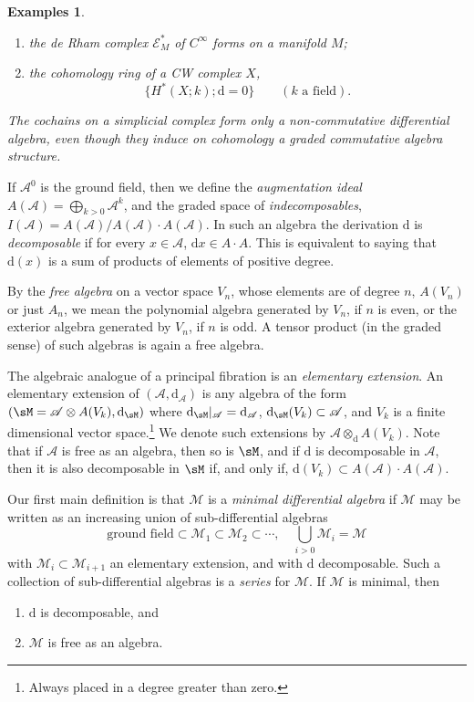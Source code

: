 \documentclass[11pt]{amsart}
\theoremstyle{plain}
\newtheorem{examples}[theorem]{Examples}
\theoremstyle{definition}
\newcommand{\sA}{\mathscr{A}}
\newcommand{\sE}{\mathscr{E}}
\newcommand{\cM}{\mathcal{M}}
\newcommand{\dd}{\mathrm{d}}
\begin{document}
\begin{examples}%
\begin{enumerate}
\item[(i)] the de Rham complex $\sE^{*}_{M}$ of $C^{\infty}$ forms on a manifold $M$;
\item[(ii)] the cohomology ring of a CW complex $X$,
\[
\{H^{*}(X; k); \dd = 0\} \qquad (k \text{ a field}).
\]
\end{enumerate}
The cochains on a simplicial complex form only a non-commutative differential algebra, even though they induce on cohomology a graded commutative algebra structure.
\end{examples}

If $\sA^{0}$ is the ground field, then we define the \emph{augmentation ideal} $A(\sA) = \bigoplus_{k > 0} \sA^{k}$, and the graded space of \emph{indecomposables}, $I(\sA) = A(\sA)/A(\sA) \cdot A(\sA)$. In such an algebra the derivation $\dd$ is \emph{decomposable} if for every $x \in \sA$, $\dd x \in A \cdot A$. This is equivalent to saying that $\dd(x)$ is a sum of products of elements of positive degree.

By the \emph{free algebra} on a vector space $V_{n}$, whose elements are of degree $n$, $A(V_{n})$ or just $A_{n}$, we mean the polynomial algebra generated by $V_{n}$, if $n$ is even, or the exterior algebra generated by $V_{n}$, if $n$ is odd. A tensor product (in the graded sense) of such algebras is again a free algebra.

The algebraic analogue of a principal fibration is an \emph{elementary extension}. An elementary extension of $(\sA, \dd_{\sA})$ is any algebra of the form $(\sM = \sA \otimes A(V_{k}), \dd_{\sM})$ where $\dd_{\sM}|_{\sA} = \dd_{\sA}$, $\dd_{\sM}(V_{k}) \subset \sA$, and $V_{k}$ is a finite dimensional vector space.\footnote{Always placed in a degree greater than zero.} We denote such extensions by $\sA \otimes_{\dd} A(V_{k})$. Note that if $\sA$ is free as an algebra, then so is $\sM$, and if $\dd$ is decomposable in $\sA$, then it is also decomposable in $\sM$ if, and only if, $\dd(V_{k}) \subset A(\sA) \cdot A(\sA)$.

Our first main definition is that $\cM$ is a \emph{minimal differential algebra} if $\cM$ may be written as an increasing union of sub-differential algebras
\[
\text{ground field} \subset \cM_{1} \subset \cM_{2} \subset \cdots, \quad \bigcup_{i > 0} \cM_{i} = \cM
\]
with $\cM_{i} \subset \cM_{i+1}$ an elementary extension, and with $\dd$ decomposable. Such a collection of sub-differential algebras is a \emph{series} for $\cM$. If $\cM$ is minimal, then
\begin{enumerate}
\item $\dd$ is decomposable, and
\item $\cM$ is free as an algebra.
\end{enumerate}
\end{document}
